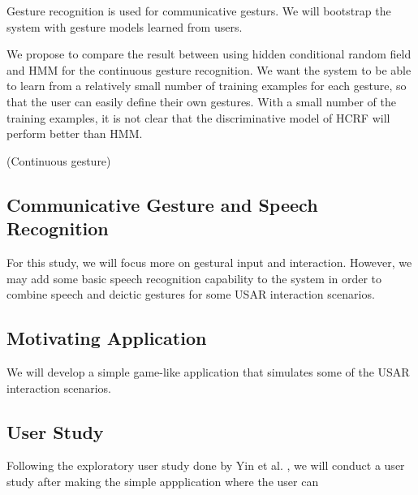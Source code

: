 Gesture recognition is used for communicative
gesturs. We will bootstrap the system with gesture models learned from users.

We propose to compare the result between using hidden conditional random field
and HMM for the continuous gesture recognition. We want the system to be able to
learn from a relatively small number of training examples for each gesture, so
that the user can easily define their own gestures. With a small number of the
training examples, it is not clear that the discriminative model of HCRF will
perform better than HMM. 

(Continuous gesture)

\subsection{Communicative Gesture and Speech Recognition} 
For this study, we will focus more on gestural input and interaction. 
However, we may add some basic speech recognition capability to the system in order to combine speech and
deictic gestures for some USAR interaction scenarios.

\subsection{Motivating Application}
We will develop a simple game-like application that simulates some of the USAR
interaction scenarios.

\subsection{User Study}\label{sec:userStudy}
Following the exploratory user study done by Yin et al. \cite{yin10}, we will
conduct a user study after making the simple appplication where the user can 

